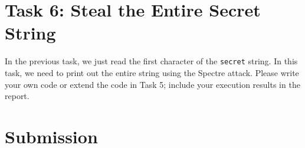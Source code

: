 \section{Task 6: Steal the Entire Secret String}

In the previous task, we  just read the first character of the \texttt{secret}
string. In this task, we need to print out the entire string using the 
Spectre attack. Please write your own code or extend the code in Task 5; include your
execution results in the report.


\section{Submission}





\def\baselinestretch{1}





